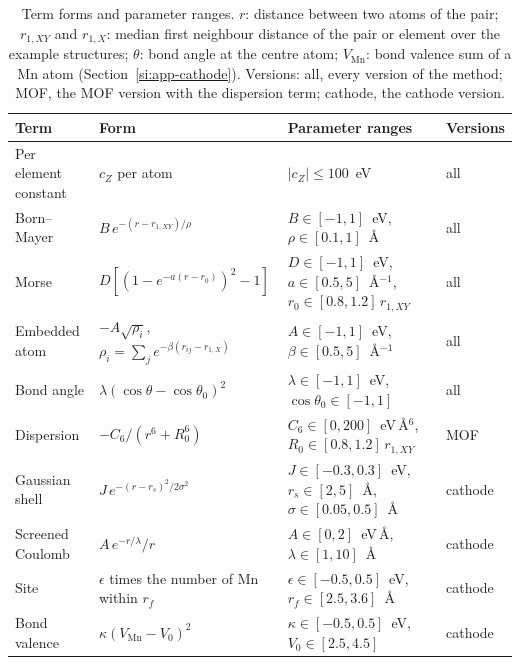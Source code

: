 \begin{table}[h]
\caption{Term forms and parameter ranges. $r$: distance between two atoms of the pair; $r_{1,XY}$ and $r_{1,X}$: median first neighbour distance of the pair or element over the example structures; $\theta$: bond angle at the centre atom; $V_\mathrm{Mn}$: bond valence sum of a Mn atom (Section~\ref{si:app-cathode}). Versions: all, every version of the method; MOF, the MOF version with the dispersion term; cathode, the cathode version.}
\label{tab:si-ranges}
\footnotesize
\begin{tabular}{@{}lp{}p{}l@{}}
\toprule
Term & Form & Parameter ranges & Versions \\
\midrule
Per element constant & \raggedright $c_Z$ per atom & \raggedright $|c_Z|\le100$~eV & all \\
Born--Mayer & \raggedright $B\,e^{-(r-r_{1,XY})/\rho}$ & \raggedright $B\in[-1,1]$~eV, $\rho\in[0.1,1]$~\AA & all \\
Morse & \raggedright $D[(1-e^{-a(r-r_0)})^2-1]$ & \raggedright $D\in[-1,1]$~eV, $a\in[0.5,5]$~\AA$^{-1}$, $r_0\in[0.8,1.2]\,r_{1,XY}$ & all \\
Embedded atom & \raggedright $-A\sqrt{\rho_i}$, $\rho_i=\sum_j e^{-\beta(r_{ij}-r_{1,X})}$ & \raggedright $A\in[-1,1]$~eV, $\beta\in[0.5,5]$~\AA$^{-1}$ & all \\
Bond angle & \raggedright $\lambda(\cos\theta-\cos\theta_0)^2$ & \raggedright $\lambda\in[-1,1]$~eV, $\cos\theta_0\in[-1,1]$ & all \\
Dispersion & \raggedright $-C_6/(r^6+R_0^6)$ & \raggedright $C_6\in[0,200]$~eV\,\AA$^6$, $R_0\in[0.8,1.2]\,r_{1,XY}$ & MOF \\
Gaussian shell & \raggedright $J\,e^{-(r-r_s)^2/2\sigma^2}$ & \raggedright $J\in[-0.3,0.3]$~eV, $r_s\in[2,5]$~\AA, $\sigma\in[0.05,0.5]$~\AA & cathode \\
Screened Coulomb & \raggedright $A\,e^{-r/\lambda}/r$ & \raggedright $A\in[0,2]$~eV\,\AA, $\lambda\in[1,10]$~\AA & cathode \\
Site & \raggedright $\epsilon$ times the number of Mn within $r_f$ & \raggedright $\epsilon\in[-0.5,0.5]$~eV, $r_f\in[2.5,3.6]$~\AA & cathode \\
Bond valence & \raggedright $\kappa(V_\mathrm{Mn}-V_0)^2$ & \raggedright $\kappa\in[-0.5,0.5]$~eV, $V_0\in[2.5,4.5]$ & cathode \\
\bottomrule
\end{tabular}
\end{table}

